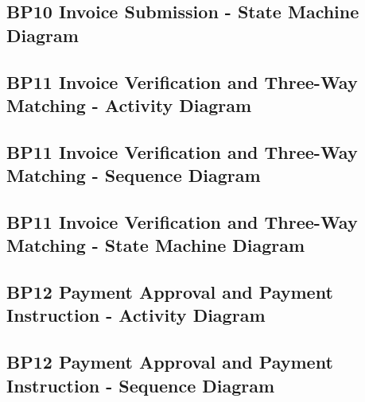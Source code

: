 \documentclass[conference]{IEEEtran}
\begin{document}
\subsection*{BP10 Invoice Submission - State Machine Diagram}



\subsection*{BP11 Invoice Verification and Three-Way Matching - Activity Diagram}



\subsection*{BP11 Invoice Verification and Three-Way Matching - Sequence Diagram}



\subsection*{BP11 Invoice Verification and Three-Way Matching - State Machine Diagram}



\subsection*{BP12 Payment Approval and Payment Instruction - Activity Diagram}



\subsection*{BP12 Payment Approval and Payment Instruction - Sequence Diagram}

\end{document}
